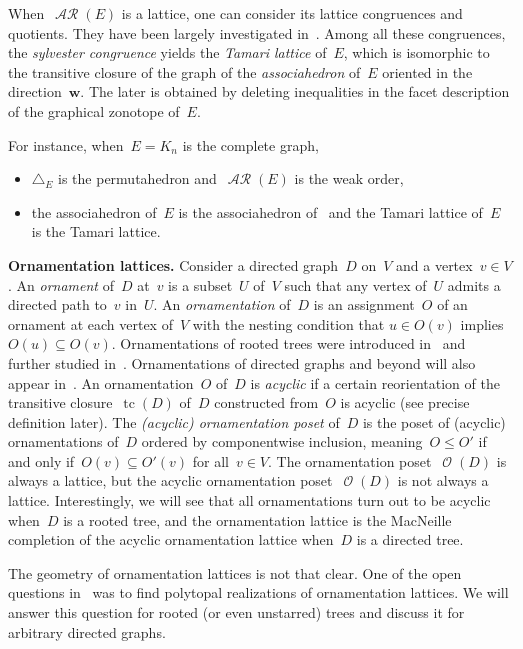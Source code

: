 \documentclass{amsart}
\theoremstyle{definition}
\renewcommand{\b}[1]{\boldsymbol{#1}} %
\renewcommand{\c}[1]{\mathcal{#1}} %
\newcommand{\simplex}{\triangle} %
\DeclareMathOperator{\tc}{tc} %
\newcommand{\para}[1]{\bigskip\noindent\textbf{#1}} %
\newcommand{\darkblue}{\color{darkblue}} %
\newcommand{\defn}[1]{\textsl{\darkblue #1}} %
\DeclareMathOperator{\Orn}{\c{O}}  %
\DeclareMathOperator{\AReori}{\c{AR}}  %
\begin{document}
When~$\AReori(E)$ is a lattice, one can consider its lattice congruences and quotients.
They have been largely investigated in~\cite{Pilaud-acyclicReorientationLattices}.
Among all these congruences, the \defn{sylvester congruence} yields the \defn{Tamari lattice} of~$E$, which is isomorphic to the transitive closure of the graph of the \defn{associahedron} of~$E$ oriented in the direction~$\b{w}$.
The later is obtained by deleting inequalities in the facet description of the graphical zonotope of~$E$.

\pagebreak
For instance, when~$E = K_n$ is the complete graph,
\begin{itemize}
\item $\simplex_E$ is the permutahedron and~$\AReori(E)$ is the weak order,
\item the associahedron of~$E$ is the associahedron of~\cite{ShniderSternberg,Loday} and the Tamari lattice of~$E$ is the Tamari lattice.
\end{itemize}


\para{Ornamentation lattices.}
Consider a directed graph~$D$ on~$V$ and a vertex~$v \in V$.
An \defn{ornament} of~$D$ at~$v$ is a subset~$U$ of~$V$ such that any vertex of~$U$ admits a directed path to~$v$ in~$U$.
An \defn{ornamentation} of~$D$ is an assignment~$O$ of an ornament at each vertex of~$V$ with the nesting condition that $u \in O(v)$ implies~$O(u) \subseteq O(v)$.
Ornamentations of rooted trees were introduced in~\cite{DefantSack} and further studied in~\cite{ajran2025pop}.
Ornamentations of directed graphs and beyond will also appear in~\cite{Sack}.
An ornamentation~$O$ of~$D$ is \defn{acyclic} if a certain reorientation of the transitive closure~$\tc(D)$ of~$D$ constructed from~$O$ is acyclic (see precise definition later).
The \defn{(acyclic) ornamentation poset} of~$D$ is the poset of (acyclic) ornamentations of~$D$ ordered by componentwise inclusion, meaning~$O \le O'$ if and only if~${O(v) \subseteq O'(v)}$ for all~$v \in V$.
The ornamentation poset~$\Orn(D)$ is always a lattice, but the acyclic ornamentation poset~$\Orn(D)$ is not always a lattice.
Interestingly, we will see that all ornamentations turn out to be acyclic when~$D$ is a rooted tree, and the ornamentation lattice is the MacNeille completion of the acyclic ornamentation lattice when~$D$ is a directed tree.

The geometry of ornamentation lattices is not that clear.
One of the open questions in~\cite{DefantSack} was to find polytopal realizations of ornamentation lattices.
We will answer this question for rooted (or even unstarred) trees and discuss it for arbitrary directed graphs.
\end{document}
